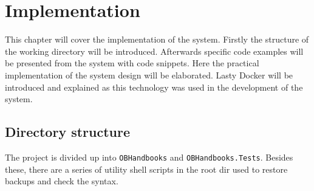 \chapter{Implementation}

This chapter will cover the implementation of the system.
Firstly the structure of the working directory will be introduced.
Afterwards specific code examples will be presented from the system with code snippets.
Here the practical implementation of the system design will be elaborated.
Lasty Docker will be introduced and explained as this technology was used in the development of the system.

\section{Directory structure}
The project is divided up into \texttt{OBHandbooks} and \texttt{OBHandbooks.Tests}. 
Besides these, there are a series of utility shell scripts in the root dir used to restore backups and check the syntax.



